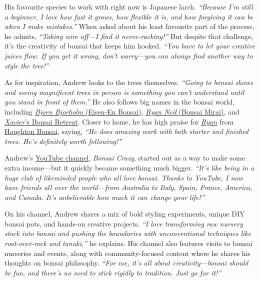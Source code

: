 His favourite species to work with right now is Japanese larch.
\emph{``Because I'm still a beginner, I love how fast it grows, how flexible it is, and how forgiving it can be when I make mistakes.''}
When asked about his least favourite part of the process, he admits, \emph{``Taking wire off---I find it nerve\--racking!''}
But despite that challenge, it's the creativity of bonsai that keeps him hooked.
\emph{``You have to let your creative juices flow. If you get it wrong, don't worry---you can always find another way to style the tree!''}

As for inspiration, Andrew looks to the trees themselves.
\emph{``Going to bonsai shows and seeing magnificent trees in person is something you can't understand until you stand in front of them.''}
He also follows big names in the bonsai world, including \href{https://www.youtube.com/@EiseienBonsai}{\emph{Bjorn Bjorholm} (Eisen-En Bonsai)}, \href{https://www.youtube.com/@BonsaiMirai}{\emph{Ryan Neil} (Bonsai Mirai)}, and \href{https://www.youtube.com/channel/UClhxFl5LJ8S9j01JV4QMpbw}{\emph{Xavier}'s Bonsai Retreat}.
Closer to home, he has high praise for
\href{https://www.youtube.com/@houghtonbonsai}{\emph{Ryan}} from \href{https://www.youtube.com/@houghtonbonsai}{Houghton Bonsai}, saying, \emph{``He does amazing work with both starter and finished trees. He's definitely worth following!''}

\medskip
{}
\noindent
Andrew's \href{https://www.youtube.com/results?search_query=bonsai+crazy}{YouTube channel}, \emph{Bonsai Crazy}, started out as a way to make some extra income---but it quickly became something much bigger.
\emph{``It's like being in a huge club of likeminded people who all love bonsai. Thanks to YouTube, I now have friends all over the world---from Australia to Italy, Spain, France, America, and Canada. It's unbelievable how much it can change your life!''}

On his channel, Andrew shares a mix of bold styling experiments, unique DIY bonsai pots, and hands\--on creative projects.
\emph{``I love transforming raw nursery stock into bonsai and pushing the boundaries with unconventional techniques like root\--over\--rock and tanuki,''} he explains.
His channel also features visits to bonsai nurseries and events, along with community\--focused content where he shares his thoughts on bonsai philosophy.
\emph{``For me, it's all about creativity---bonsai should be fun, and there's no need to stick rigidly to tradition. Just go for it!''}

